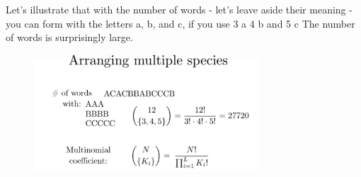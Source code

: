 \documentclass[12pt, a4paper]{scrartcl}
\begin{document}
Let’s illustrate that with the number of words - let's leave aside their meaning - you can form with the letters a, b, and c, if you use 3 a 4 b and 5 c
The number of words is surprisingly large.\\
 \begin{figure}[H]
	\centering
	\includegraphics[width=0.75\textwidth]{4_4.png}
\end{figure}
\end{document}

